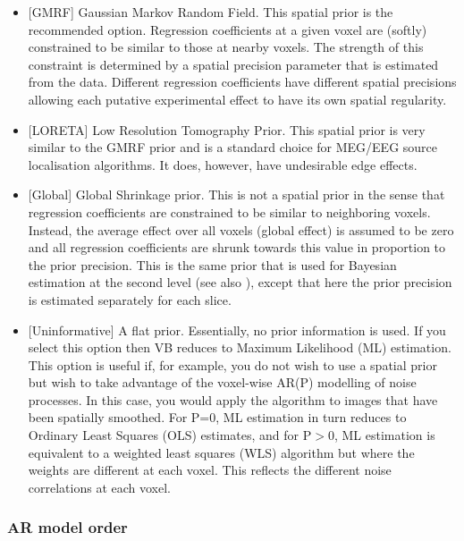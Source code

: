 \begin{itemize}

\item{[GMRF] Gaussian Markov Random Field. This spatial prior is the recommended option. Regression coefficients at a given voxel are (softly) constrained to be similar to those at nearby voxels. The strength of this constraint is determined by a spatial precision parameter that is estimated from the data. Different regression coefficients have different spatial precisions allowing each putative experimental effect to have its own spatial regularity. }

\item{[LORETA] Low Resolution Tomography Prior. This spatial prior is very similar to the GMRF prior and is a standard choice for MEG/EEG source localisation algorithms. It does, however, have undesirable edge effects.}                                                                                                    

\item{[Global] Global Shrinkage prior. This is not a spatial prior in the sense that regression coefficients are constrained to be similar to neighboring voxels. Instead, the average effect over all voxels (global effect) is assumed to be zero and all regression coefficients are shrunk towards this value in proportion to the prior precision. This is the same prior that is used for Bayesian estimation at the second level (see also \cite{karl_posterior}), except that here the prior precision is estimated separately for each slice. }

\item{[Uninformative] A flat prior. Essentially, no prior information is used. If you select this option then VB reduces to Maximum Likelihood (ML) estimation. This option is useful if, for example, you do not wish to use a spatial prior but wish to take advantage of the voxel-wise AR(P) modelling of noise processes. In this case, you would apply the algorithm to images that have been spatially smoothed. For P=0, ML estimation in turn reduces to Ordinary Least Squares (OLS) estimates, and for P$>$0, ML estimation is equivalent to a weighted least squares (WLS) algorithm but where the weights are different at each voxel. This reflects the different noise correlations at each voxel. }

\end{itemize}

\subsubsection{AR model order}

